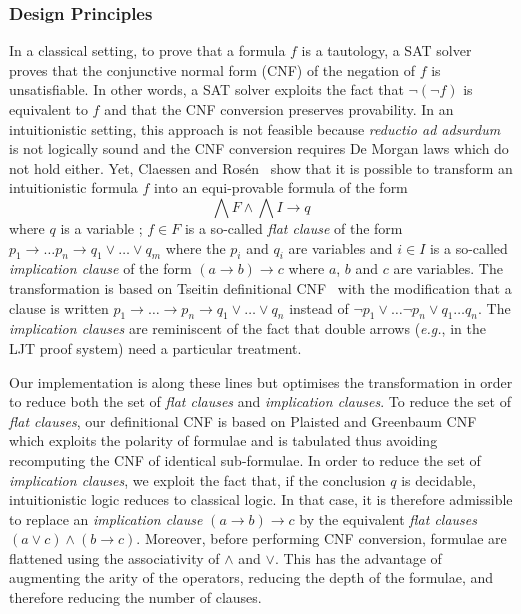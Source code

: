 \documentclass[a4paper,UKenglish,cleveref, autoref, thm-restate]{lipics-v2019}
\begin{document}
\subsubsection{Design Principles}
In a classical setting, to prove that a formula $f$ is a tautology, a
SAT solver proves that the conjunctive normal form (CNF) of the
negation of $f$ is unsatisfiable. In other words, a SAT solver
exploits the fact that $\neg (\neg f)$ is equivalent to $f$ and that
the CNF conversion preserves provability.
%
In an intuitionistic setting, this approach is not feasible because
\emph{reductio ad adsurdum} is not logically sound and
the CNF conversion requires De Morgan laws which do not hold either.
%
Yet, Claessen and Rosén~\cite{ClaessenR15} show that it is possible to
transform an intuitionistic  formula $f$ into an equi-provable formula of the form
\[
  \bigwedge F \land \bigwedge I \to q
\]
where $q$ is a variable ; $f \in F$ is a so-called \emph{flat clause} of the
form $p_1 \to \dots p_n \to q_1 \lor \dots \lor q_m$ where the $p_i$
and $q_i$ are variables and $i\in I$ is a so-called \emph{implication clause}
of the form $(a\to b) \to c $ where $a$, $b$ and $c$ are variables.
%
The transformation is based on Tseitin definitional CNF~\cite{Tseitin1983} with the
modification that a clause is written
$p_1 \to \dots \to p_n \to q_1 \lor \dots \lor q_n$ instead of
$\neg p_1 \lor \dots \neg p_n \lor q_1 \dots q_n$.
%
The \emph{implication clauses} are reminiscent of the fact that double
arrows (\emph{e.g.}, in the LJT proof system) need a particular
treatment. %

Our implementation is along these lines but optimises the
transformation in order to reduce both the set of \emph{flat clauses}
and \emph{implication clauses}.  To reduce the set of \emph{flat
  clauses}, our definitional CNF is based on Plaisted and Greenbaum
CNF~\cite{PlaistedG86} which exploits the polarity of formulae and is
tabulated thus avoiding recomputing the CNF of identical sub-formulae.
%
In order to reduce the set of \emph{implication clauses}, we exploit
the fact that, if the conclusion $q$ is decidable, intuitionistic logic reduces to
classical logic. In that case, it is therefore
admissible to replace an \emph{implication clause} $(a \to b) \to c$
by the equivalent \emph{flat clauses} $(a\lor c) \land (b \to c)$.
%
Moreover, before performing CNF conversion, formulae are flattened
using the associativity of $\land$ and $\lor$. This has the advantage
of augmenting the arity of the operators, reducing the depth of the
formulae, and therefore reducing the number of clauses.
\end{document}
